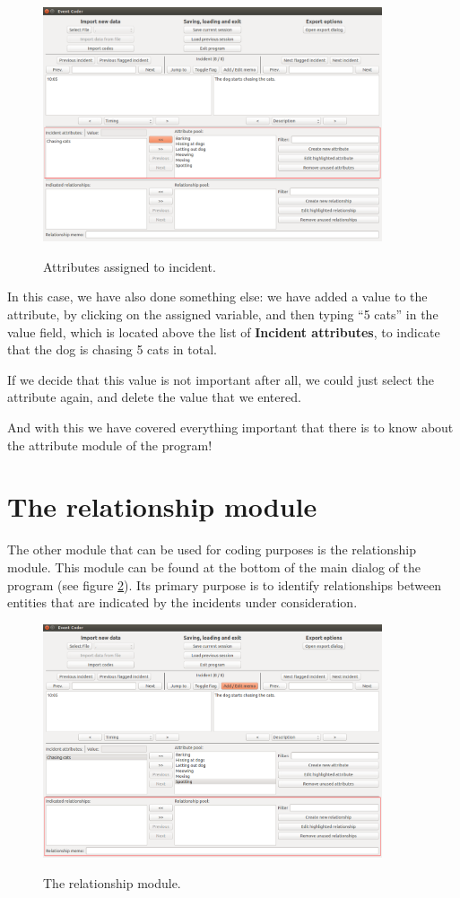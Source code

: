 \documentclass{memoir}
\begin{document}
\begin{figure}[h!]
  \centering
  \caption{Attributes assigned to incident.}
  \includegraphics[width=100mm]{Screenshot_13.pdf}
  \label{fig:assignedattributes}
\end{figure}

In this case, we have also done something else: we have added a value to the attribute, by clicking on the assigned variable, and then typing ``5 cats'' in the value field, which is located above the list of \textbf{Incident attributes}, to indicate that the dog is chasing 5 cats in total.

If we decide that this value is not important after all, we could just select the attribute again, and delete the value that we entered.

And with this we have covered everything important that there is to know about the attribute module of the program!

\section{The relationship module}
\label{sec:relationshipmodule}

The other module that can be used for coding purposes is the relationship module. This module can be found at the bottom of the main dialog of the program (see figure \ref{fig:relationshipmodule}). Its primary purpose is to identify relationships between entities that are indicated by the incidents under consideration. 
\begin{figure}[h!]
  \centering
  \caption{The relationship module.}
  \includegraphics[width=100mm]{Screenshot_14.pdf}
  \label{fig:relationshipmodule}
\end{figure}
\end{document}
